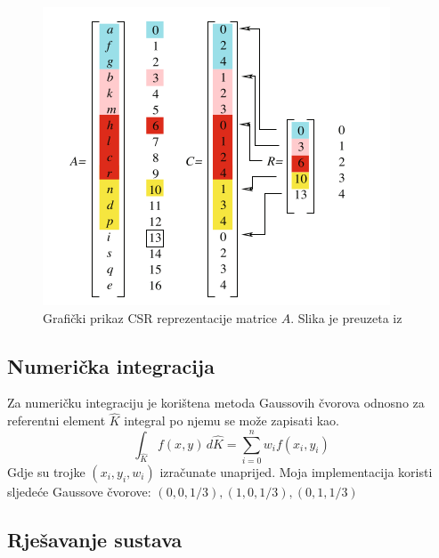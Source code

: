 \documentclass[zavrsnirad]{../fer}
\begin{document}
\begin{figure}[htb]
	\centering
	\includegraphics[width=0.7\linewidth]{Figures/CSR.png}
  \caption{Grafički prikaz CSR reprezentacije matrice $A$. Slika je preuzeta iz \cite{Quarteroni}}
	\label{CSR}
\end{figure}
\newpage
\subsection{Numerička integracija}
Za numeričku integraciju je korištena metoda Gaussovih 
čvorova odnosno za referentni element $\hat{K}$ integral
po njemu se može zapisati kao.
$$\int_{\hat{K}} f(x,y) \, d\hat{K} = \sum_{i = 0}^n w_i f(x_i,y_i)$$
Gdje su trojke $(x_i, y_i, w_i)$ izračunate unaprijed.
Moja implementacija koristi sljedeće Gaussove čvorove:
$(0,0,1/3), (1,0, 1/3),(0,1,1 / 3)$


\subsection{Rješavanje sustava}
\end{document}
